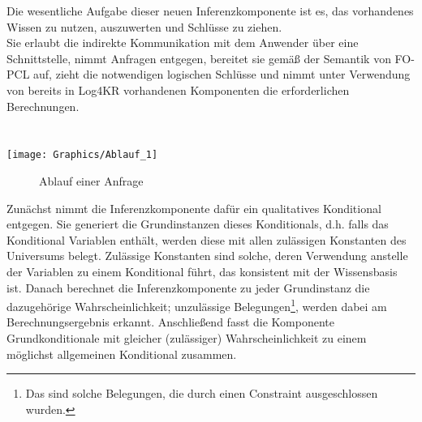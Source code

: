 \documentclass[draft]{scrreprt}
\begin{document}
Die wesentliche Aufgabe dieser neuen Inferenzkomponente ist es, das vorhandenes Wissen zu nutzen, auszuwerten und Schlüsse zu ziehen.\\
Sie erlaubt die indirekte Kommunikation mit dem Anwender über eine Schnittstelle, nimmt Anfragen entgegen, bereitet sie gemäß der Semantik von FO-PCL auf, zieht die notwendigen logischen Schlüsse und nimmt unter Verwendung von bereits in Log4KR vorhandenen Komponenten die erforderlichen Berechnungen.
\\
\\
\\ 
\texttt{[image: Graphics/Ablauf\_1]}
\begin{figure}[h]
	\caption{Ablauf einer Anfrage}
	\label{Ablauf}
\end{figure}
 
Zunächst nimmt die Inferenzkomponente dafür ein qualitatives Konditional entgegen. Sie generiert die Grundinstanzen dieses Konditionals, d.h. falls das Konditional Variablen enthält, werden diese mit allen zulässigen Konstanten des Universums belegt. Zulässige Konstanten sind solche, deren Verwendung anstelle der Variablen zu einem Konditional führt, das konsistent mit der Wissensbasis ist. Danach berechnet die Inferenzkomponente zu jeder Grundinstanz die dazugehörige Wahrscheinlichkeit; unzulässige Belegungen\footnote{Das sind solche Belegungen, die durch einen Constraint ausgeschlossen wurden.}, werden dabei am Berechnungsergebnis erkannt. Anschließend fasst die Komponente Grundkonditionale mit gleicher (zulässiger) Wahrscheinlichkeit zu einem möglichst allgemeinen Konditional zusammen.
\end{document}
